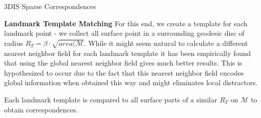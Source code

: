 \documentclass[10pt,twocolumn,letterpaper]{article}
\begin{document}
\begin{algorithm}[h]
	\caption{3DIS Sparse Correspondences}
	\begin{algorithmic}
		 
		\EndFor
		\EndProcedure
	\end{algorithmic}
\end{algorithm}

\textbf{Landmark Template Matching}
For this end, we create a template for each landmark point - we collect all surface point in a surrounding geodesic disc of radius $R_T=\beta\cdot\sqrt{area(\mathcal{M}}$. While it might seem natural to calculate a different nearest neighbor field for each landmark template it has been empirically found that using the global nearest neighbor field gives much better results. This is hypothesized to occur due to the fact that this nearest neighbor field encodes global information when obtained this way and might  eliminates local distractors.

Each landmark template is compared to all surface parts of a similar $R_T$ on $\mathcal{M}$ to obtain correspondences.


\end{document}
